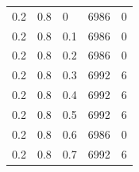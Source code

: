\documentclass[12pt,a4paper]{report}
\begin{document}
\begin{table}[ht]
\begin{tabular}{ | l | l | l | l | l |}
		0.2      & 0.8     & 0   & 6986      & 0       \\
		0.2      & 0.8     & 0.1 & 6986      & 0       \\
		0.2      & 0.8     & 0.2 & 6986      & 0       \\
		0.2      & 0.8     & 0.3 & 6992      & 6       \\
		0.2      & 0.8     & 0.4 & 6992      & 6       \\
		0.2      & 0.8     & 0.5 & 6992      & 6       \\
		0.2      & 0.8     & 0.6 & 6986      & 0       \\
		0.2      & 0.8     & 0.7 & 6992      & 6       \\
		\hline
	\end{tabular}
\end{table}
\end{document}
